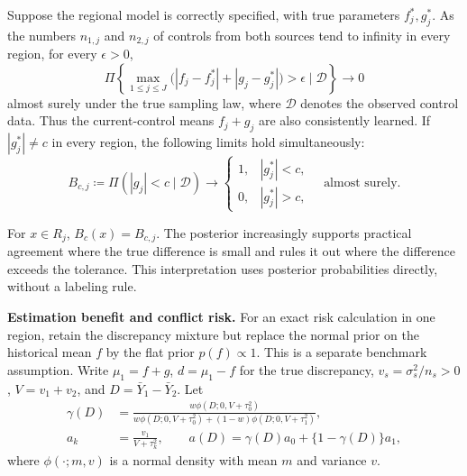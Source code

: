\documentclass[11pt]{article}
\begin{document}
\begin{theorem}\label{thm:regional_learning}
Suppose the regional model is correctly specified, with true parameters $f_j^*,g_j^*$. As the numbers $n_{1,j}$ and $n_{2,j}$ of controls from both sources tend to infinity in every region, for every $\epsilon>0$,
\[
\Pi\left\{\max_{1\leq j\leq J}
\bigl(|f_j-f_j^*|+|g_j-g_j^*|\bigr)>\epsilon\mid\mathcal D\right\}\longrightarrow0
\]
almost surely under the true sampling law, where $\mathcal D$ denotes the observed control data. Thus the current-control means $f_j+g_j$ are also consistently learned. If $|g_j^*|\ne c$ in every region, the following limits hold simultaneously:
\begin{equation}\label{eq:regional_agreement}
B_{c,j}\coloneqq\Pi(|g_j|<c\mid\mathcal D)
\longrightarrow
\begin{cases}
1,& |g_j^*|<c,\\
0,& |g_j^*|>c,
\end{cases}
\quad\text{almost surely}.
\end{equation}
\end{theorem}
For $x\in R_j$, $B_c(x)=B_{c,j}$. The posterior increasingly supports practical agreement where the true difference is small and rules it out where the difference exceeds the tolerance. This interpretation uses posterior probabilities directly, without a labeling rule.

\noindent\textbf{Estimation benefit and conflict risk.}
For an exact risk calculation in one region, retain the discrepancy mixture but replace the normal prior on the historical mean $f$ by the flat prior $p(f)\propto1$. This is a separate benchmark assumption. Write $\mu_1=f+g$, $d=\mu_1-f$ for the true discrepancy, $v_s=\sigma_s^2/n_s>0$, $V=v_1+v_2$, and $D=\bar Y_1-\bar Y_2$. Let
\begin{equation}\label{eq:regional_weight}
\begin{aligned}
\gamma(D)&=\frac{w\phi(D;0,V+\tau_0^2)}
{w\phi(D;0,V+\tau_0^2)+(1-w)\phi(D;0,V+\tau_1^2)},\\
a_k&=\frac{v_1}{V+\tau_k^2},\qquad
a(D)=\gamma(D)a_0+\{1-\gamma(D)\}a_1,
\end{aligned}
\end{equation}
where $\phi(\cdot;m,v)$ is a normal density with mean $m$ and variance $v$.
\end{document}
